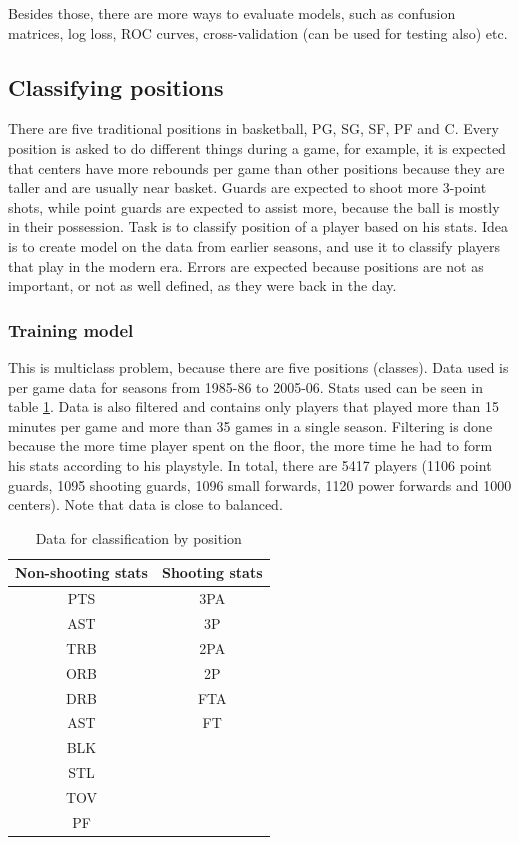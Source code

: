\documentclass[a4paper]{article}
\begin{document}
Besides those, there are more ways to evaluate models, such as confusion matrices, log loss, ROC curves, cross-validation (can be used for testing also) etc.

\subsection{Classifying positions}
\label{subsec:pos_clf}

There are five traditional positions in basketball, PG, SG, SF, PF and C. Every position is asked to do different things during a game, for example, it is expected that centers have more rebounds per game than other positions because they are taller and are usually near basket. Guards are expected to shoot more 3-point shots, while point guards are expected to assist more, because the ball is mostly in their possession. Task is to classify position of a player based on his stats. Idea is to create model on the data from earlier seasons, and use it to classify players that play in the modern era. Errors are expected because positions are not as important, or not as well defined, as they were back in the day.

\subsubsection{Training model}
\label{subsubsec:pos_clf_training}

This is multiclass problem, because there are five positions (classes). Data used is per game data for seasons from 1985-86 to 2005-06. Stats used can be seen in table \ref{tab:pos_clf_data}. Data is also filtered and contains only players that played more than 15 minutes per game and more than 35 games in a single season. Filtering is done because the more time player spent on the floor, the more time he had to form his stats according to his playstyle. In total, there are 5417 players (1106 point guards, 1095 shooting guards, 1096 small forwards, 1120 power forwards and 1000 centers). Note that data is close to balanced.

\begin{table}[!h]
\begin{center}
\begin{tabular}{|c|c|} \hline
Non-shooting stats & Shooting stats \\ \hline
PTS & 3PA\\
AST & 3P\\
TRB & 2PA \\
ORB & 2P \\
DRB & FTA \\
AST & FT \\
BLK & \\
STL & \\
TOV & \\
PF & \\ \hline
\end{tabular}
\caption{Data for classification by position}
\label{tab:pos_clf_data}
\end{center}
\end{table}
\end{document}
